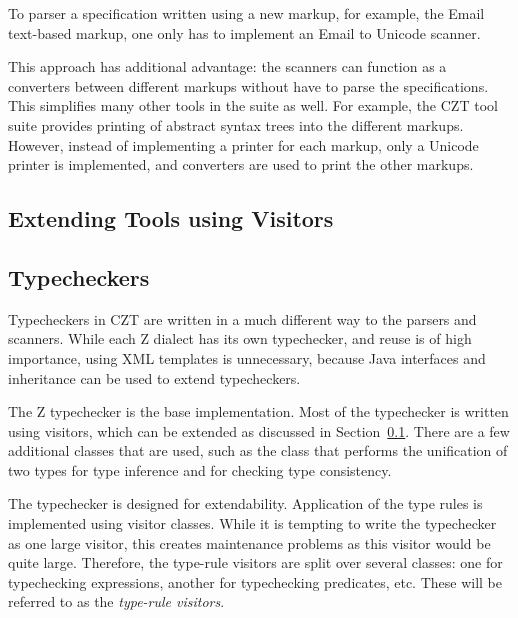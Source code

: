 \documentclass{llncs}
\begin{document}
To parser a specification written using a new markup, for example, the
Email text-based markup, one only has to implement an Email to Unicode
scanner.

This approach has additional advantage: the scanners can function as a
converters between different markups without have to parse the
specifications. This simplifies many other tools in the suite as
well. For example, the CZT tool suite provides printing of abstract
syntax trees into the different markups. However, instead of
implementing a printer for each markup, only a Unicode printer is
implemented, and converters are used to print the other markups.

\subsection{Extending Tools using Visitors}
\label{extending-visitors}

\subsection{Typecheckers}

Typecheckers in CZT are written in a much different way to the parsers
and scanners. While each Z dialect has its own typechecker, and reuse
is of high importance, using XML templates is unnecessary, because
Java interfaces and inheritance can be used to extend typecheckers.

The Z typechecker is the base implementation. Most of the typechecker
is written using visitors, which can be extended as discussed in
Section~\ref{extending-visitors}. There are a few additional classes
that are used, such as the class that performs the unification of two
types for type inference and for checking type consistency.

The typechecker is designed for extendability. Application of the type
rules is implemented using visitor classes. While it is tempting to
write the typechecker as one large visitor, this creates maintenance
problems as this visitor would be quite large. Therefore, the
type-rule visitors are split over several classes: one for
typechecking expressions, another for typechecking predicates,
etc. These will be referred to as the {\em type-rule visitors}.
\end{document}
